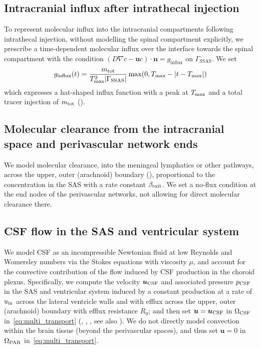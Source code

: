 \documentclass[fleqn,10pt]{wlscirep}
\begin{document}
\subsection*{Intracranial influx after intrathecal injection}
To represent molecular influx into the intracranial compartments
following intrathecal injection, without modelling the spinal
compartment explicitly, we prescribe a time-dependent molecular influx
over the interface towards the spinal compartment with the condition
$(D \nabla c - \bm u c ) \cdot \bm{n} = g_{\mathrm{influx}}$ on
$\Gamma_{\mathrm{SSAS}}$. We set
\begin{equation}
  g_\mathrm{influx}(t) = \frac{m_{\rm tot}}{T_{\rm max}^2 |\Gamma_{\rm SSAS}|} \max(0, T_{\rm max} - |t - T_{\rm max}|)
\end{equation}
which expresses a hat-shaped influx function with a peak at $T_{\rm max}$ and a total tracer injection of $m_{\rm tot}$ ().

\subsection*{Molecular clearance from the intracranial space and perivascular network ends}

We model molecular clearance, into the meningeal lymphatics or other
pathways, across the upper, outer (arachnoid) boundary
(), proportional to the concentration
in the SAS with a rate constant $\beta_{\rm exit}$. We set a no-flux
condition at the end nodes of the perivascular networks, not allowing
for direct molecular clearance there.

\subsection*{CSF flow in the SAS and ventricular system}
\label{sec:csf_fluid_vel}

We model CSF as an incompressible Newtonian fluid at low Reynolds and
Womersley numbers via the Stokes equations with viscosity $\mu$, and
account for the convective contribution of the flow induced by CSF
production in the choroid plexus. Specifically, we compute the
velocity $\bm u_{\rm CSF}$ and associated pressure $p_{\rm CSF}$ in
the SAS and ventricular system induced by a constant production at a
rate of $u_{\rm in}$ across the lateral ventricle walls and with
efflux across the upper, outer (arachnoid) boundary with efflux
resistance $R_0$; and then set $\bm u = \bm u_{\rm CSF}$ in
$\Omega_{\rm CSF}$ in~\eqref{eq:multi_transport}
(, ,
, see also ). We do not
directly model convection within the brain tissue (beyond the
perivascular spaces), and thus set $\bm u = 0$ in $\Omega_{\rm PAR}$
in~\eqref{eq:multi_transport}.
\end{document}
